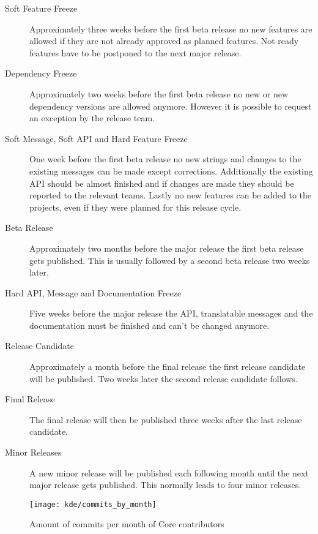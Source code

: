 \begin{description}

  \item[Soft Feature Freeze] Approximately three weeks before the first beta
    release no new features are allowed if they are not already approved as
    planned features. Not ready features have to be postponed to the next major
    release.

  \item[Dependency Freeze] Approximately two weeks before the first beta
    release no new or new dependency versions are allowed anymore. However it
    is possible to request an exception by the release team.

  \item[Soft Message, Soft API and Hard Feature Freeze] One week before
    the first beta release no new strings and changes to the existing messages
    can be made except corrections. Additionally the existing API should be
    almost finished and if changes are made they should be reported to the
    relevant teams. Lastly no new features can be added to the projects, even
    if they were planned for this release cycle.

  \item[Beta Release] Approximately two months before the major release the
    first beta release gets published. This is usually followed by a second
    beta release two weeks later.

  \item[Hard API, Message and Documentation Freeze] Five weeks before the
    major release the \ac{API}, translatable messages and the documentation
    must be finished and can't be changed anymore.

  \item[Release Candidate] Approximately a month before the final release the
    first release candidate will be published. Two weeks later the second
    release candidate follows.

  \item[Final Release] The final release will then be published three weeks after
    the last release candidate.

  \item[Minor Releases] A new minor release will be published each following
    month until the next major release gets published. This normally leads to
    four minor releases.

\end{description}

\begin{figure}[htbp]
  \centering
  \texttt{[image: kde/commits\_by\_month]}
  \caption{Amount of commits per month of Core contributors}
\end{figure}


